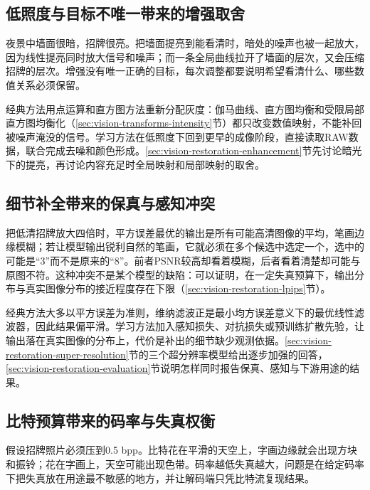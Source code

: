 \subsection{低照度与目标不唯一带来的增强取舍}
\label{sec:vision-restoration-challenge-enhancement}

夜景中墙面很暗，招牌很亮。把墙面提亮到能看清时，暗处的噪声也被一起放大，因为线性提亮同时放大信号和噪声；而一条全局曲线拉开了墙面的层次，又会压缩招牌的层次。增强没有唯一正确的目标，每次调整都要说明希望看清什么、哪些数值关系必须保留。

经典方法用点运算和直方图方法重新分配灰度：伽马曲线、直方图均衡和受限局部直方图均衡化（\ref{sec:vision-transforms-intensity}节）都只改变数值映射，不能补回被噪声淹没的信号。学习方法在低照度下回到更早的成像阶段，直接读取RAW数据，联合完成去噪和颜色形成。\ref{sec:vision-restoration-enhancement}节先讨论暗光下的提亮，再讨论内容充足时全局映射和局部映射的取舍。

\subsection{细节补全带来的保真与感知冲突}
\label{sec:vision-restoration-challenge-perception}

把低清招牌放大四倍时，平方误差最优的输出是所有可能高清图像的平均，笔画边缘模糊；若让模型输出锐利自然的笔画，它就必须在多个候选中选定一个，选中的可能是“3”而不是原来的“8”。前者PSNR较高却看着模糊，后者看着清楚却可能与原图不符。这种冲突不是某个模型的缺陷：可以证明，在一定失真预算下，输出分布与真实图像分布的接近程度存在下限（\ref{sec:vision-restoration-lpips}节）。

经典方法大多以平方误差为准则，维纳滤波正是最小均方误差意义下的最优线性滤波器，因此结果偏平滑。学习方法加入感知损失、对抗损失或预训练扩散先验，让输出落在真实图像的分布上，代价是补出的细节缺少观测依据。\ref{sec:vision-restoration-super-resolution}节的三个超分辨率模型给出逐步加强的回答，\ref{sec:vision-restoration-evaluation}节说明怎样同时报告保真、感知与下游用途的结果。

\subsection{比特预算带来的码率与失真权衡}
\label{sec:vision-restoration-challenge-rate}

假设招牌照片必须压到0.5 bpp。比特花在平滑的天空上，字画边缘就会出现方块和振铃；花在字画上，天空可能出现色带。码率越低失真越大，问题是在给定码率下把失真放在用途最不敏感的地方，并让解码端只凭比特流复现结果。

